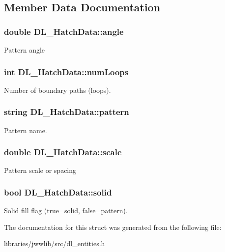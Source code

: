 \subsection{Member Data Documentation}
\hypertarget{structDL__HatchData_affcd2ae51a28b575288215f279ba186f}{
\subsubsection[{angle}]{\setlength{\rightskip}{0pt plus 5cm}double D\-L\-\_\-\-Hatch\-Data\-::angle}}\label{structDL__HatchData_affcd2ae51a28b575288215f279ba186f}
Pattern angle \hypertarget{structDL__HatchData_a2632acede38e4a3f7cae7b4adabf6487}{
\subsubsection[{num\-Loops}]{\setlength{\rightskip}{0pt plus 5cm}int D\-L\-\_\-\-Hatch\-Data\-::num\-Loops}}\label{structDL__HatchData_a2632acede38e4a3f7cae7b4adabf6487}
Number of boundary paths (loops). \hypertarget{structDL__HatchData_a183c4d897d8ca242caccdb6fb8f352c7}{
\subsubsection[{pattern}]{\setlength{\rightskip}{0pt plus 5cm}string D\-L\-\_\-\-Hatch\-Data\-::pattern}}\label{structDL__HatchData_a183c4d897d8ca242caccdb6fb8f352c7}
Pattern name. \hypertarget{structDL__HatchData_ad337db248afb78ed45437270ce8428ae}{
\subsubsection[{scale}]{\setlength{\rightskip}{0pt plus 5cm}double D\-L\-\_\-\-Hatch\-Data\-::scale}}\label{structDL__HatchData_ad337db248afb78ed45437270ce8428ae}
Pattern scale or spacing \hypertarget{structDL__HatchData_a85079b66124e6a2cee445e898b98d485}{
\subsubsection[{solid}]{\setlength{\rightskip}{0pt plus 5cm}bool D\-L\-\_\-\-Hatch\-Data\-::solid}}\label{structDL__HatchData_a85079b66124e6a2cee445e898b98d485}
Solid fill flag (true=solid, false=pattern). 

The documentation for this struct was generated from the following file\-:\begin{DoxyCompactItemize}
\item 
libraries/jwwlib/src/dl\-\_\-entities.\-h\end{DoxyCompactItemize}
